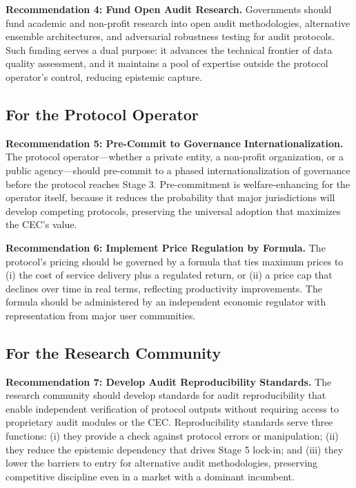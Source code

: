 \documentclass[12pt,a4paper]{article}
\theoremstyle{definition}
\theoremstyle{remark}
\begin{document}
\textbf{Recommendation 4: Fund Open Audit Research.} Governments should fund academic and non-profit research into open audit methodologies, alternative ensemble architectures, and adversarial robustness testing for audit protocols. Such funding serves a dual purpose: it advances the technical frontier of data quality assessment, and it maintains a pool of expertise outside the protocol operator's control, reducing epistemic capture.

\subsection{For the Protocol Operator}

\textbf{Recommendation 5: Pre-Commit to Governance Internationalization.} The protocol operator—whether a private entity, a non-profit organization, or a public agency—should pre-commit to a phased internationalization of governance before the protocol reaches Stage 3. Pre-commitment is welfare-enhancing for the operator itself, because it reduces the probability that major jurisdictions will develop competing protocols, preserving the universal adoption that maximizes the CEC's value.

\textbf{Recommendation 6: Implement Price Regulation by Formula.} The protocol's pricing should be governed by a formula that ties maximum prices to (i) the cost of service delivery plus a regulated return, or (ii) a price cap that declines over time in real terms, reflecting productivity improvements. The formula should be administered by an independent economic regulator with representation from major user communities.

\subsection{For the Research Community}

\textbf{Recommendation 7: Develop Audit Reproducibility Standards.} The research community should develop standards for audit reproducibility that enable independent verification of protocol outputs without requiring access to proprietary audit modules or the CEC. Reproducibility standards serve three functions: (i) they provide a check against protocol errors or manipulation; (ii) they reduce the epistemic dependency that drives Stage 5 lock-in; and (iii) they lower the barriers to entry for alternative audit methodologies, preserving competitive discipline even in a market with a dominant incumbent.
\end{document}
